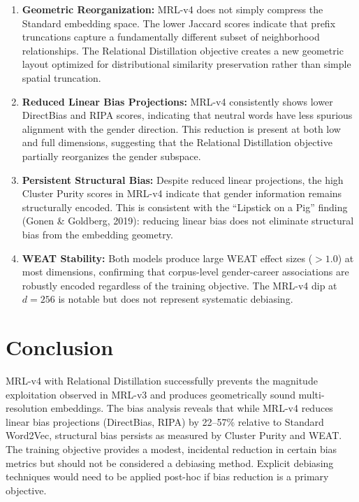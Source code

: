\documentclass[11pt,a4paper]{article}
\begin{document}
\begin{enumerate}
    \item \textbf{Geometric Reorganization:} MRL-v4 does not simply compress the Standard embedding space. The lower Jaccard scores indicate that prefix truncations capture a fundamentally different subset of neighborhood relationships. The Relational Distillation objective creates a new geometric layout optimized for distributional similarity preservation rather than simple spatial truncation.
    
    \item \textbf{Reduced Linear Bias Projections:} MRL-v4 consistently shows lower DirectBias and RIPA scores, indicating that neutral words have less spurious alignment with the gender direction. This reduction is present at both low and full dimensions, suggesting that the Relational Distillation objective partially reorganizes the gender subspace.
    
    \item \textbf{Persistent Structural Bias:} Despite reduced linear projections, the high Cluster Purity scores in MRL-v4 indicate that gender information remains structurally encoded. This is consistent with the ``Lipstick on a Pig'' finding (Gonen \& Goldberg, 2019): reducing linear bias does not eliminate structural bias from the embedding geometry.
    
    \item \textbf{WEAT Stability:} Both models produce large WEAT effect sizes ($>1.0$) at most dimensions, confirming that corpus-level gender-career associations are robustly encoded regardless of the training objective. The MRL-v4 dip at $d=256$ is notable but does not represent systematic debiasing.
\end{enumerate}

\section{Conclusion}

MRL-v4 with Relational Distillation successfully prevents the magnitude exploitation observed in MRL-v3 and produces geometrically sound multi-resolution embeddings. The bias analysis reveals that while MRL-v4 reduces linear bias projections (DirectBias, RIPA) by 22--57\% relative to Standard Word2Vec, structural bias persists as measured by Cluster Purity and WEAT. The training objective provides a modest, incidental reduction in certain bias metrics but should not be considered a debiasing method. Explicit debiasing techniques would need to be applied post-hoc if bias reduction is a primary objective.
\end{document}
